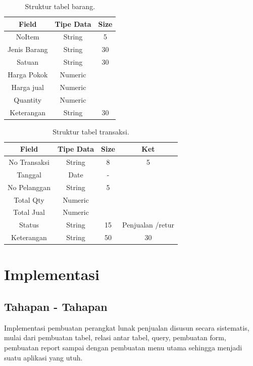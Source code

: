 \documentclass{article}
\begin{document}
\begin{table}[h!]
\centering
\begin{tabular}{||c c c ||} 
 \hline
 Field & Tipe Data & Size \\ [0.5ex] 
 \hline\hline
NoItem & String & 5 \\
Jenis Barang & String & 30 \\
Satuan & String & 30 \\
Harga Pokok & Numeric & \\	
Harga jual & Numeric & \\	
Quantity & Numeric & \\
Keterangan & String & 30 \\ [1ex]
 \hline
\end{tabular}
\caption{Struktur tabel barang.}
\label{table:2}
\end{table}

\begin{table}[h!]
\centering
\begin{tabular}{||c c c c ||} 
 \hline
 Field & Tipe Data & Size & Ket \\ [0.5ex] 
 \hline\hline
No Transaksi & String  & 8 & 5 \\
Tanggal & Date & -  & \\	
No Pelanggan & String & 5 & \\	
Total Qty & Numeric & &  \\		
Total Jual & Numeric & & \\		
Status & String & 15 & Penjualan /retur \\
Keterangan & String & 50 & 30 \\ [1ex]
 \hline
\end{tabular}
\caption{Struktur tabel transaksi.}
\label{table:3}
\end{table}

\section{Implementasi}
\subsection{Tahapan - Tahapan}
Implementasi pembuatan perangkat lunak penjualan disusun secara sistematis, mulai dari pembuatan tabel, relasi antar tabel, query, pembuatan form, pembuatan report  sampai dengan pembuatan menu utama sehingga menjadi suatu aplikasi yang utuh.
\end{document}

